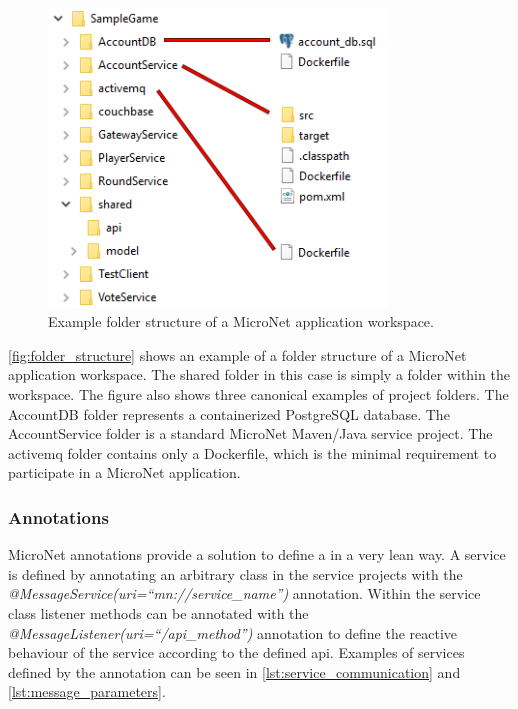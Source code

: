 \begin{figure}
	\centering
	\includegraphics[width=9cm]{images/tools/folder_structure}
	\caption{Example folder structure of a MicroNet application workspace.}
	\label{fig:folder_structure}
\end{figure}

\autoref{fig:folder_structure} shows an example of a folder structure of a
MicroNet application workspace. The shared folder in this case is simply a folder within the
workspace. The figure also shows three canonical examples of project folders.
The AccountDB folder represents a containerized PostgreSQL database. The
AccountService folder is a standard MicroNet Maven/Java service project. The
activemq folder contains only a Dockerfile, which is the minimal requirement to
participate in a MicroNet application.

\subsubsection{Annotations}

MicroNet annotations provide a solution to define a \ms{} in a very lean way.
A service is defined by annotating an arbitrary class in the service projects
with the \textit{@MessageService(uri=``mn://service\_name'')} annotation. Within
the service class listener methods can be annotated with the
\textit{@MessageListener(uri=``/api\_method'')} annotation to define the
reactive behaviour of the service according to the defined \gls{api}. Examples of
services defined by the annotation can be seen in
\autoref{lst:service_communication} and \autoref{lst:message_parameters}.

